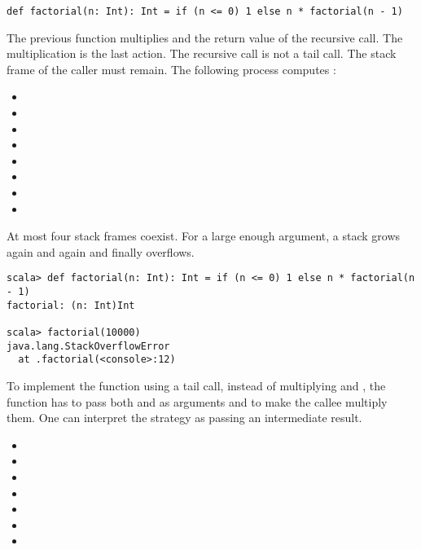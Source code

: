 \begin{verbatim}
def factorial(n: Int): Int = if (n <= 0) 1 else n * factorial(n - 1)
\end{verbatim}

The previous  function multiplies  and the return value
of the recursive  call. The multiplication is the last
action. The recursive call is not a tail call. The stack frame of the caller must
remain. The following process computes :

\begin{itemize}
\item {}
\item {}
\item {}
\item {}
\item {}
\item {}
\item {}
\item {}
\end{itemize}

At most four stack frames coexist. For a large enough argument, a stack grows
again and again and finally overflows.

\begin{verbatim}
scala> def factorial(n: Int): Int = if (n <= 0) 1 else n * factorial(n - 1)
factorial: (n: Int)Int

scala> factorial(10000)
java.lang.StackOverflowError
  at .factorial(<console>:12)
\end{verbatim}

To implement the function using a tail call, instead of multiplying  and
, the function has to pass both  and 
as arguments and to make the callee multiply them. One can interpret the strategy
as passing an intermediate result.

\begin{itemize}
\item {}
\item {}
\item {}
\item {}
\item {}
\item {}
\item {}
\end{itemize}

